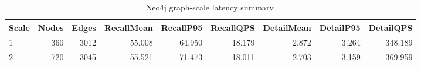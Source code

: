 \begin{table}[t]
\centering
\caption{Neo4j graph-scale latency summary.}
\label{tab:ltmg-graph-scale-latency}
\begin{tabular}{lrrrrrrrr}
\hline
Scale & Nodes & Edges & RecallMean & RecallP95 & RecallQPS & DetailMean & DetailP95 & DetailQPS \\
\hline
1 & 360 & 3012 & 55.008 & 64.950 & 18.179 & 2.872 & 3.264 & 348.189 \\
2 & 720 & 3045 & 55.521 & 71.473 & 18.011 & 2.703 & 3.159 & 369.959 \\
\hline
\end{tabular}
\end{table}
